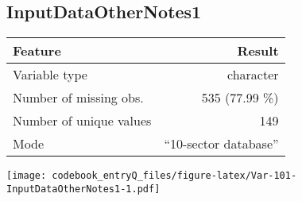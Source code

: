 \documentclass[]{article}
\newcommand{\fullline}{\noindent\makebox[\linewidth]{\rule{\textwidth}{0.4pt}}}
\newcommand{\bminione}{\begin{minipage}{0.75 \textwidth}}
\newcommand{\bminitwo}{\begin{minipage}{0.25 \textwidth}}
\newcommand{\emini}{\end{minipage}}
\begin{document}
\fullline

\hypertarget{inputdataothernotes1}{\subsection{InputDataOtherNotes1}\label{inputdataothernotes1}}

\bminione

\begin{longtable}[]{@{}lr@{}}
\toprule
\begin{minipage}[b]{0.34\columnwidth}\raggedright\strut
Feature\strut
\end{minipage} & \begin{minipage}[b]{0.29\columnwidth}\raggedleft\strut
Result\strut
\end{minipage}\tabularnewline
\midrule
\endhead
\begin{minipage}[t]{0.34\columnwidth}\raggedright\strut
Variable type\strut
\end{minipage} & \begin{minipage}[t]{0.29\columnwidth}\raggedleft\strut
character\strut
\end{minipage}\tabularnewline
\begin{minipage}[t]{0.34\columnwidth}\raggedright\strut
Number of missing obs.\strut
\end{minipage} & \begin{minipage}[t]{0.29\columnwidth}\raggedleft\strut
535 (77.99 \%)\strut
\end{minipage}\tabularnewline
\begin{minipage}[t]{0.34\columnwidth}\raggedright\strut
Number of unique values\strut
\end{minipage} & \begin{minipage}[t]{0.29\columnwidth}\raggedleft\strut
149\strut
\end{minipage}\tabularnewline
\begin{minipage}[t]{0.34\columnwidth}\raggedright\strut
Mode\strut
\end{minipage} & \begin{minipage}[t]{0.29\columnwidth}\raggedleft\strut
``10-sector database''\strut
\end{minipage}\tabularnewline
\bottomrule
\end{longtable}

\emini
\bminitwo
\texttt{[image: codebook\_entryQ\_files/figure-latex/Var-101-InputDataOtherNotes1-1.pdf]}
\emini
\end{document}
